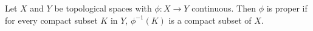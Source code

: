 Let $X$ and $Y$ be topological spaces with $\phi: X \to Y$ continuous. Then $\phi$ is proper if for every compact subset $K$ in $Y$, $\phi^{-1}(K)$ is a compact subset of $X$.
